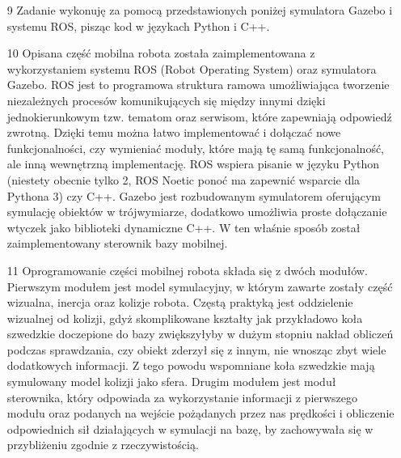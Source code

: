 \documentclass[20pt,a4paper]{article}
\begin{document}
\begin{itemize}
    \item[9]
 		Zadanie wykonuję za pomocą przedstawionych poniżej symulatora Gazebo i systemu ROS, pisząc kod w językach Python i C++.	
 		\item[10]
    Opisana część mobilna robota została zaimplementowana z wykorzystaniem systemu ROS (Robot Operating System) oraz symulatora Gazebo. 
    ROS jest to programowa struktura ramowa umożliwiająca tworzenie niezależnych procesów komunikujących się między innymi dzięki jednokierunkowym tzw. tematom oraz serwisom, które zapewniają odpowiedź zwrotną.
     Dzięki temu można łatwo implementować i dołączać nowe funkcjonalności, czy wymieniać moduły, które mają tę samą funkcjonalność, ale inną wewnętrzną implementację.
    ROS wspiera pisanie w języku Python (niestety obecnie tylko 2, ROS Noetic ponoć ma zapewnić wsparcie dla Pythona 3) czy C++. 
    Gazebo jest rozbudowanym symulatorem oferującym symulację obiektów w trójwymiarze, dodatkowo umożliwia proste dołączanie wtyczek jako biblioteki dynamiczne C++.
    W ten właśnie sposób został zaimplementowany sterownik bazy mobilnej.
    \item[11]
    Oprogramowanie części mobilnej robota składa się z dwóch modułów. 
    Pierwszym modułem jest model symulacyjny, 
    w którym zawarte zostały część wizualna, inercja oraz kolizje robota.
        Częstą praktyką jest oddzielenie wizualnej od kolizji, gdyż skomplikowane kształty 
    jak przykładowo koła szwedzkie doczepione do bazy zwiększyłyby w dużym stopniu nakład obliczeń podczas sprawdzania, czy obiekt zderzył się z innym, nie wnosząc zbyt wiele dodatkowych informacji.
    Z tego powodu wspomniane koła szwedzkie mają symulowany model kolizji jako sfera.
        Drugim modułem jest moduł sterownika, który odpowiada za wykorzystanie informacji z pierwszego modułu oraz podanych na wejście pożądanych przez nas prędkości i obliczenie odpowiednich sił działających w symulacji na bazę, by zachowywała się w przybliżeniu zgodnie z rzeczywistością.
    

\end{itemize}
\end{document}

